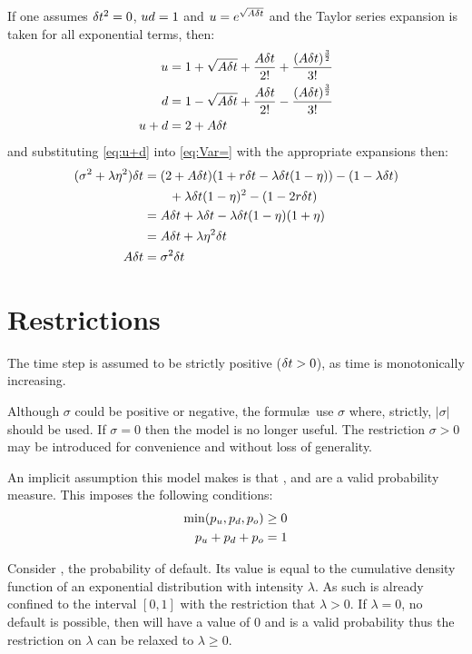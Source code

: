 \documentclass[a4paper,11pt,oneside]{report}
\theoremstyle{plain}
\theoremstyle{definition}
\begin{document}
If one assumes $\delta t^2 = 0$, $ud = 1$ and $u = e^{\sqrt{A\delta t}}$ and the Taylor series expansion is taken for all exponential terms, then:
\begin{align}
 u                     &= 1 + \sqrt{A\delta t} + \frac{A\delta t}{2!} + \frac{(A\delta t)^{\frac{3}{2}}}{3!} \nonumber\\
 d                     &= 1 - \sqrt{A\delta t} + \frac{A\delta t}{2!} - \frac{(A\delta t)^{\frac{3}{2}}}{3!} \nonumber\\
 u + d                &= 2 + A\delta t \label{eq:u+d}
\end{align}
and substituting \eqref{eq:u+d} into \eqref{eq:Var=} with the appropriate expansions then:
\begin{align}
 (\sigma^2 + \lambda\eta^2)\delta t &= (2 + A\delta t)(1 + r\delta t - \lambda\delta t(1 - \eta)) - (1 - \lambda\delta t) \nonumber\\
                        &\qquad + \lambda\delta t(1 - \eta)^2 - (1 - 2r\delta t) \nonumber\\
                        &= A\delta t + \lambda\delta t - \lambda\delta t(1 - \eta)(1 + \eta) \nonumber\\
                        &= A\delta t + \lambda\eta^2\delta t \nonumber\\
 A\delta t                   &= \sigma^2\delta t
\end{align}


\section{Restrictions}
The time step \Dt is assumed to be strictly positive ($\delta t > 0$), as time is monotonically increasing.

Although $\sigma$ could be positive or negative, the formul\ae\ use $\sigma$ where, strictly, $|\sigma|$ should be used.  If $\sigma = 0$ then the model is no longer useful.  The restriction $\sigma > 0$ may be introduced for convenience and without loss of generality.

An implicit assumption this model makes is that \pu, \pd and \po are a valid probability measure.  This imposes the following conditions:
\begin{align}
 \min(p_u, p_d, p_o) &\ge 0 \\
 p_u + p_d + p_o &= 1 \label{eq:bin_prob_limit}
\end{align}

Consider \po, the probability of default.  Its value is equal to the cumulative density function of an exponential distribution with intensity $\lambda$.  As such \po is already confined to the interval $[0, 1]$ with the restriction that $\lambda > 0$.  If $\lambda = 0$, no default is possible, then \po will have a value of 0 and is a valid probability thus the restriction on $\lambda$ can be relaxed to $\lambda \ge 0$.
\end{document}
